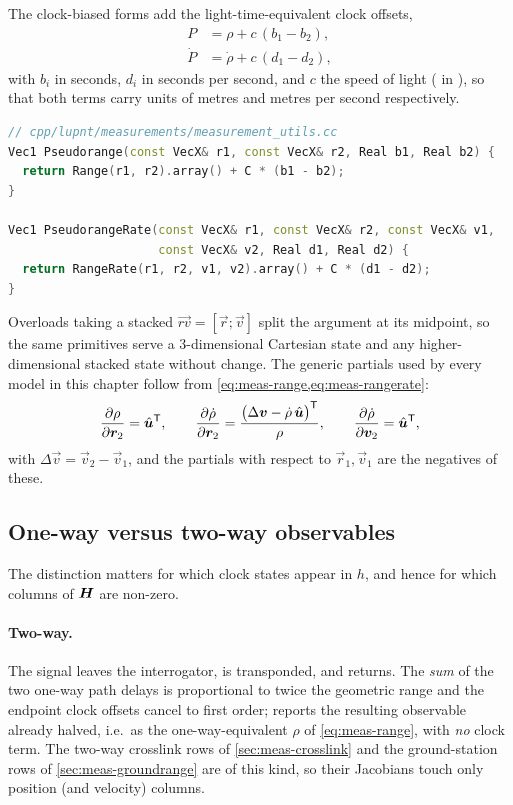 The clock-biased forms add the light-time-equivalent clock offsets,
\begin{align}
  P    &= \rho + c\,(b_1 - b_2),
  \label{eq:meas-pseudorange} \\
  \dot{P} &= \dot{\rho} + c\,(d_1 - d_2),
  \label{eq:meas-prr}
\end{align}
with $b_i$ in seconds, $d_i$ in seconds per second, and
$c$ the speed of light ( in ), so that
both terms carry units of metres and metres per second respectively.

\begin{lstlisting}[language=cpp, caption={Clock-biased range primitives.},
  label={lst:meas-pseudorange}]
// cpp/lupnt/measurements/measurement_utils.cc
Vec1 Pseudorange(const VecX& r1, const VecX& r2, Real b1, Real b2) {
  return Range(r1, r2).array() + C * (b1 - b2);
}

Vec1 PseudorangeRate(const VecX& r1, const VecX& r2, const VecX& v1,
                     const VecX& v2, Real d1, Real d2) {
  return RangeRate(r1, r2, v1, v2).array() + C * (d1 - d2);
}
\end{lstlisting}

Overloads taking a stacked $\vec{rv} = [\vec{r}; \vec{v}]$ split the argument
at its midpoint, so the same primitives serve a 3-dimensional Cartesian state
and any higher-dimensional stacked state without change. The generic partials
used by every model in this chapter follow from
\cref{eq:meas-range,eq:meas-rangerate}:
\begin{equation}
  \frac{\partial \rho}{\partial \bm{r}_2} = \hat{\bm{u}}^{\mathsf{T}},
  \qquad
  \frac{\partial \dot{\rho}}{\partial \bm{r}_2}
    = \frac{\big(\Delta\bm{v} - \dot{\rho}\,\hat{\bm{u}}\big)^{\mathsf{T}}}{\rho},
  \qquad
  \frac{\partial \dot{\rho}}{\partial \bm{v}_2} = \hat{\bm{u}}^{\mathsf{T}},
  \label{eq:meas-partials}
\end{equation}
with $\Delta\vec{v} = \vec{v}_2 - \vec{v}_1$, and the partials with respect to
$\vec{r}_1, \vec{v}_1$ are the negatives of these.

\subsection{One-way versus two-way observables}
\label{sec:meas-oneway-twoway}

The distinction matters for which clock states appear in $h$, and hence for
which columns of $\bm{H}$ are non-zero.

\paragraph{Two-way.} The signal leaves the interrogator, is transponded, and
returns. The \emph{sum} of the two one-way path delays is proportional to
twice the geometric range and the endpoint clock offsets cancel to first order;
\lupnt{} reports the resulting observable already halved, i.e.\ as the
one-way-equivalent $\rho$ of \cref{eq:meas-range}, with \emph{no} clock term.
The two-way crosslink rows of \cref{sec:meas-crosslink} and the ground-station
rows of \cref{sec:meas-groundrange} are of this kind, so their Jacobians touch
only position (and velocity) columns.


